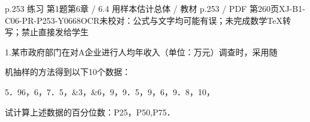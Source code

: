 \begin{bankitem}{p.253 练习 第1题}{第6章 / 6.4 用样本估计总体 / 教材 p.253 / PDF 第260页}{XJ-B1-C06-PR-P253-Y0668}{OCR未校对：公式与文字均可能有误；未完成数学TeX转写；禁止直接发给学生}
\begin{ocrdraft}
\par
1.某市政府部门在对A企业进行人均年收入（单位：万元）调查时，采用随
\par
机抽样的方法得到以下10个数据：
\par
5．96，6，7．5，\&3，\&6，9，9．5，9，6，9．8，10，
\par
试计算上述数据的百分位数：P25，P50,P75．
\end{ocrdraft}
\end{bankitem}
